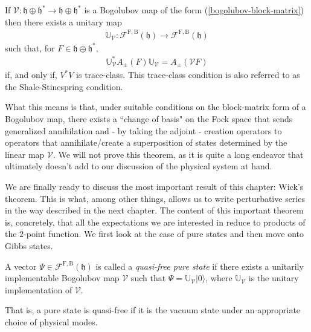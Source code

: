 \begin{theorem}
	\label{thm:bogolubov-unitary}
	If $\mathcal{V} : \mathfrak{h}\oplus\mathfrak{h}^* \to \mathfrak{h}\oplus\mathfrak{h}^*$
	is a Bogolubov map of the form (\ref{bogolubov-block-matrix}) then there exists a unitary
	map
	\begin{align*}
		\mathbb{U}_\mathcal{V} : \mathcal{F}^{\mathrm{F,B}}(\mathfrak{h}) \to \mathcal{F}^{\mathrm{F,B}}(\mathfrak{h})
	\end{align*}
	such that, for $F\in\mathfrak{h}\oplus\mathfrak{h}^*$,
	\begin{align*}
		\mathbb{U}_\mathcal{V}^*A_\pm(F)\mathbb{U}_\mathcal{V} = A_\pm(\mathcal{V}F)
	\end{align*}
	if, and only if, $V^*V$ is trace-class. This trace-class condition is also referred to as
	the Shale-Stinespring condition.
\end{theorem}

What this means is that, under suitable conditions on the block-matrix form of a Bogolubov
map, there exists a ``change of basis" on the Fock space that sends generalized annihilation
and - by taking the adjoint - creation operators to operators that annihilate/create a
superposition of states determined by the linear map $\mathcal{V}$. We will not prove this
theorem, as it is quite a long endeavor that ultimately doesn't add to our discussion of
the physical system at hand.

We are finally ready to discuss the most important result of this chapter: Wick's theorem.
This is what, among other things, allows us to write perturbative series in the way described
in the next chapter. The content of this important theorem is, concretely, that all the
expectations we are interested in reduce to products of the 2-point function. We first look at
the case of pure states and then move onto Gibbs states.

\begin{definition}
	A vector $\Psi\in\mathcal{F}^{\mathrm{F,B}}(\mathfrak{h})$ is called a \textit{quasi-free
	pure state} if there exists a unitarily implementable Bogolubov map $\mathcal{V}$ such
	that $\Psi = \mathbb{U}_\mathcal{V}|0\rangle$, where $\mathbb{U}_\mathcal{V}$ is the
	unitary implementation of $\mathcal{V}$.
\end{definition}

That is, a pure state is quasi-free if it is the vacuum state under an appropriate choice of
physical modes.

